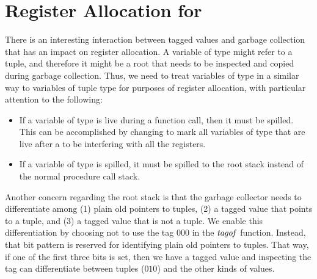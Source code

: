 \documentclass[7x10]{TimesAPriori_MIT}%
\def\racketEd{0}
\def\pythonEd{1}
\def\edition{1}
\newcommand{\racket}[1]{{\if\edition\racketEd{#1}\fi}}
\newcommand{\pythonColor}[0]{}
\newcommand{\python}[1]{{\if\edition\pythonEd\pythonColor #1\fi}}
\newtheorem{exercise}[theorem]{Exercise}
\numberwithin{theorem}{chapter}
\numberwithin{definition}{chapter}
\numberwithin{equation}{chapter}
\begin{document}



\section{Register Allocation for \LangAny{} }
\label{sec:register-allocation-Lany}

There is an interesting interaction between tagged values and garbage
collection that has an impact on register allocation.  A variable of
type \ANYTY{} might refer to a tuple, and therefore it might be a root
that needs to be inspected and copied during garbage collection. Thus,
we need to treat variables of type \ANYTY{} in a similar way to
variables of tuple type for purposes of register allocation,
with particular attention to the following:
\begin{itemize}
\item If a variable of type \ANYTY{} is live during a function call,
  then it must be spilled. This can be accomplished by changing
   to mark all variables of type \ANYTY{}
  that are live after a  to be interfering with all the
  registers.

\item If a variable of type \ANYTY{} is spilled, it must be spilled to
  the root stack instead of the normal procedure call stack.
\end{itemize}

Another concern regarding the root stack is that the garbage collector
needs to differentiate among (1) plain old pointers to tuples, (2) a
tagged value that points to a tuple, and (3) a tagged value that is
not a tuple. We enable this differentiation by choosing not to use the
tag $000$ in the $\mathit{tagof}$ function. Instead, that bit pattern is
reserved for identifying plain old pointers to tuples. That way, if
one of the first three bits is set, then we have a tagged value and
inspecting the tag can differentiate between tuples ($010$) and the
other kinds of values.

\end{document}
